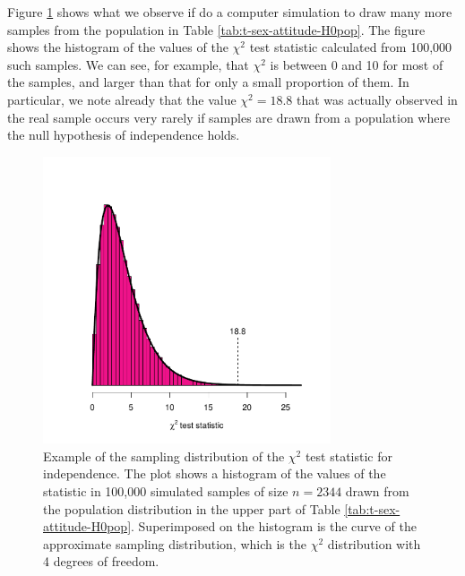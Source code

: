 \documentclass[11pt,a4paper,openany]{book}
\begin{document}
Figure \ref{fig:f-chisampld} shows what we observe if do a computer
simulation to draw many more samples from the population in Table
\ref{tab:t-sex-attitude-H0pop}. The figure shows the histogram of the
values of the \(\chi^{2}\) test statistic calculated from 100,000 such
samples. We can see, for example, that \(\chi^{2}\) is between 0 and 10
for most of the samples, and larger than that for only a small
proportion of them. In particular, we note already that the value
\(\chi^{2}=18.8\) that was actually observed in the real sample occurs
very rarely if samples are drawn from a population where the null
hypothesis of independence holds.

\begin{figure}[htbp]
\centering
\includegraphics[width=8.50000cm]{chi2sims.pdf}
\caption{\label{fig:f-chisampld} Example of the sampling distribution of the
\(\chi^{2}\) test statistic for independence. The plot shows a histogram
of the values of the statistic in 100,000 simulated samples of size
\(n=2344\) drawn from the population distribution in the upper part of
Table \ref{tab:t-sex-attitude-H0pop}. Superimposed on the histogram is
the curve of the approximate sampling distribution, which is the
\(\chi^{2}\) distribution with 4 degrees of freedom.}
\end{figure}
\end{document}
